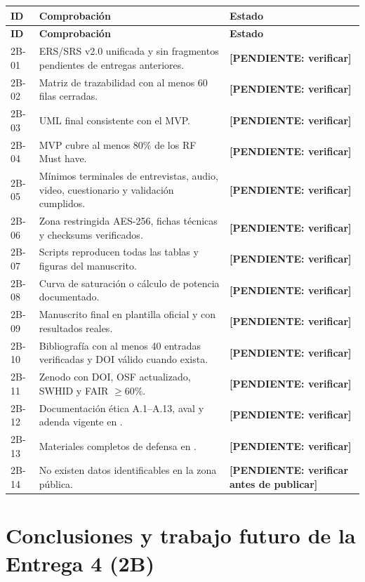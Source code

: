 \documentclass[12pt,journal,onecolumn]{IEEEtran}
\newcommand{\pendiente}[1]{\textcolor{red!70!black}{\textbf{[PENDIENTE: #1]}}}
\begin{document}
\begin{longtable}{P{0.08\textwidth}P{0.72\textwidth}P{0.13\textwidth}}
\toprule
\textbf{ID} & \textbf{Comprobación} & \textbf{Estado} \\
\midrule
\endfirsthead
\toprule
\textbf{ID} & \textbf{Comprobación} & \textbf{Estado} \\
\midrule
\endhead
2B-01 & ERS/SRS v2.0 unificada y sin fragmentos pendientes de entregas anteriores. & \pendiente{verificar} \\
2B-02 & Matriz de trazabilidad con al menos 60 filas cerradas. & \pendiente{verificar} \\
2B-03 & UML final consistente con el MVP. & \pendiente{verificar} \\
2B-04 & MVP cubre al menos 80\% de los RF Must have. & \pendiente{verificar} \\
2B-05 & Mínimos terminales de entrevistas, audio, video, cuestionario y validación cumplidos. & \pendiente{verificar} \\
2B-06 & Zona restringida AES-256, fichas técnicas y checksums verificados. & \pendiente{verificar} \\
2B-07 & Scripts reproducen todas las tablas y figuras del manuscrito. & \pendiente{verificar} \\
2B-08 & Curva de saturación o cálculo de potencia documentado. & \pendiente{verificar} \\
2B-09 & Manuscrito final en plantilla oficial y con resultados reales. & \pendiente{verificar} \\
2B-10 & Bibliografía con al menos 40 entradas verificadas y DOI válido cuando exista. & \pendiente{verificar} \\
2B-11 & Zenodo con DOI, OSF actualizado, SWHID y FAIR $\geq 60\%$. & \pendiente{verificar} \\
2B-12 & Documentación ética A.1--A.13, aval y adenda vigente en . & \pendiente{verificar} \\
2B-13 & Materiales completos de defensa en . & \pendiente{verificar} \\
2B-14 & No existen datos identificables en la zona pública. & \pendiente{verificar antes de publicar} \\
\bottomrule
\end{longtable}

\section{Conclusiones y trabajo futuro de la Entrega 4 (2B)}
\label{sec:conclusiones2b}
\end{document}
